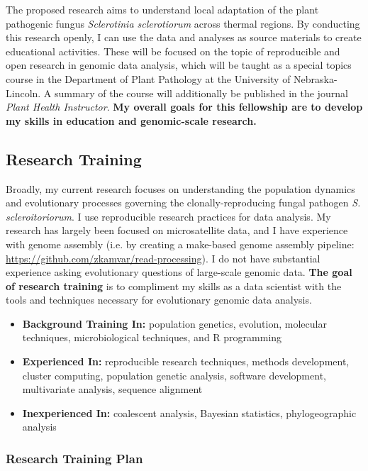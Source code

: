 \documentclass[12pt,letterpaper]{article}
\begin{document}
The proposed research aims to understand local adaptation of the plant pathogenic fungus \textit{Sclerotinia sclerotiorum} across thermal regions. 
By conducting this research openly, I can use the data and analyses as source materials to create educational activities. 
These will be focused on the topic of reproducible and open research in genomic data analysis, which will be taught as a special topics course in the Department of Plant Pathology at the University of Nebraska-Lincoln. 
A summary of the course will additionally be published in the journal \textit{Plant Health Instructor}. 
\textbf{My overall goals for this fellowship are to develop my skills in education and genomic-scale research.} 

\subsection{Research Training}

Broadly, my current research focuses on understanding the population dynamics and evolutionary processes governing the clonally-reproducing fungal pathogen \textit{S. scleroitoriorum}.
I use reproducible research practices for data analysis. 
My research has largely been focused on microsatellite data, and I have experience with genome assembly (i.e. by creating a make-based genome assembly pipeline: \url{https://github.com/zkamvar/read-processing}).
I do not have substantial experience asking evolutionary questions of large-scale genomic data. 
\textbf{The goal of research training} is to compliment my skills as a data scientist with the tools and techniques necessary for evolutionary genomic data analysis. 

\begin{itemize}
  \item \textbf{Background Training In: } population genetics, evolution, molecular techniques, microbiological techniques, and R programming
  \item \textbf{Experienced In: } reproducible research techniques, methods development, cluster computing, population genetic analysis, software development, multivariate analysis, sequence alignment
  \item \textbf{Inexperienced In: } coalescent analysis, Bayesian statistics, phylogeographic analysis
\end{itemize}

\subsubsection{Research Training Plan}
\end{document}

